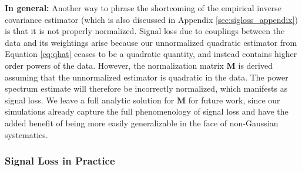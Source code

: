 \documentclass[preprint2,numberedappendix,tighten]{aastex6}  %
\newcommand{\dcj}[1]{{\color{orange} \textbf{[DCJ: #1]}}}
\begin{document}


{\bf In general:} Another way to phrase the shortcoming of the empirical inverse covariance estimator (which is also discussed in Appendix \ref{sec:sigloss_appendix}) is that it is not properly normalized. Signal loss due to couplings between the data and its weightings arise because our unnormalized quadratic estimator from Equation \eqref{eq:qhat} ceases to be a quadratic quantity, and instead contains higher order powers of the data. However, the normalization matrix $\mathbf{M}$ is derived assuming that the unnormalized estimator is quadratic in the data. The power spectrum estimate will therefore be incorrectly normalized, which manifests as signal loss. We leave a full analytic solution for $\mathbf{M}$ for future work, since our simulations already capture the full phenomenology of signal loss and have the added benefit of being more easily generalizable in the face of non-Gaussian systematics.

\subsubsection{Signal Loss in Practice}
\label{sec:Practice}
\end{document}
